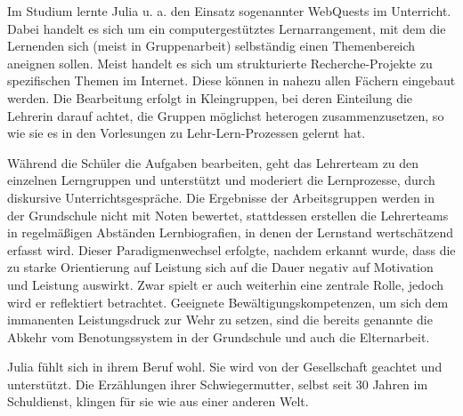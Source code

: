 \documentclass[12pt,a4paper]{article}
\begin{document}
\begin{appendix}
Im Studium lernte Julia u. a. den Einsatz sogenannter WebQuests im Unterricht. Dabei handelt es sich um ein computergestütztes Lernarrangement, mit dem die Lernenden sich (meist in Gruppenarbeit) selbständig einen Themenbereich aneignen sollen. Meist handelt es sich um strukturierte Recherche-Projekte zu spezifischen Themen im Internet. Diese können in nahezu allen Fächern eingebaut werden. Die Bearbeitung erfolgt in Kleingruppen, bei deren Einteilung die Lehrerin darauf achtet, die Gruppen möglichst heterogen zusammenzusetzen, so wie sie es in den Vorlesungen zu Lehr-Lern-Prozessen gelernt hat.

Während die Schüler die Aufgaben bearbeiten, geht das Lehrerteam zu den einzelnen Lerngruppen und unterstützt und moderiert die Lernprozesse, durch diskursive Unterrichtsgespräche.
Die Ergebnisse der Arbeitsgruppen werden in der Grundschule nicht mit Noten bewertet, stattdessen erstellen die Lehrerteams in regelmäßigen Abständen Lernbiografien, in denen der Lernstand wertschätzend erfasst wird. Dieser Paradigmenwechsel erfolgte, nachdem erkannt wurde, dass die zu starke Orientierung auf Leistung sich auf die Dauer negativ auf Motivation und Leistung auswirkt. Zwar spielt er auch weiterhin eine zentrale Rolle, jedoch wird er reflektiert betrachtet. Geeignete Bewältigungskompetenzen, um sich dem immanenten Leistungsdruck zur Wehr zu setzen, sind die bereits genannte die Abkehr vom Benotungssystem in der Grundschule und auch die Elternarbeit.

Julia fühlt sich in ihrem Beruf wohl. Sie wird von der Gesellschaft geachtet und unterstützt. Die Erzählungen ihrer Schwiegermutter, selbst seit 30 Jahren im Schuldienst, klingen für sie wie aus einer anderen Welt.
\pagebreak

\end{appendix}
\end{document}

